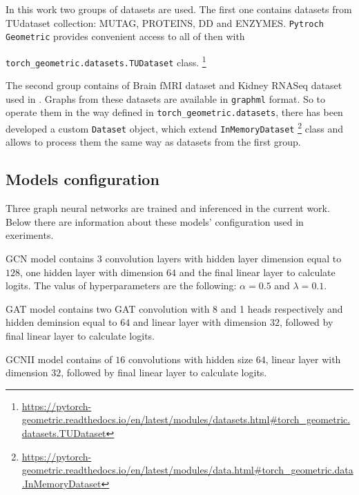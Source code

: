 


In this work two groups of datasets are used. The first one contains datasets from TUdataset\cite{TUDataset}
collection: MUTAG, PROTEINS, DD and ENZYMES. \texttt{Pytroch Geometric} provides convenient access to all of then with

\texttt{torch\_geometric.datasets.TUDataset} class.
\footnote{\url{https://pytorch-geometric.readthedocs.io/en/latest/modules/datasets.html\#torch_geometric.datasets.TUDataset}}


The second group contains of Brain fMRI dataset and Kidney RNASeq dataset used in \cite{Netpro2vec}. Graphs from
these datasets are available in \texttt{graphml} format. So to operate them in the way
defined in \texttt{torch\_geometric.datasets}, there has been developed a custom \texttt{Dataset} object, which
extend \texttt{InMemoryDataset} \footnote{\url{https://pytorch-geometric.readthedocs.io/en/latest/modules/data.html\#torch_geometric.data.InMemoryDataset}}
class and allows to process them the same way as datasets from the first group.

\subsection{Models configuration}

Three graph neural networks are trained and inferenced in the current work. Below there are information
about these models' configuration used in exeriments.

GCN model contains 3 convolution layers with hidden layer dimension equal to $128$,
one hidden layer with dimension $64$ and the final linear layer to calculate logits.
The valus of hyperparameters are the following: $\alpha=0.5$ and $\lambda=0.1$.

GAT model contains two GAT convolution with 8 and 1 heads respectively and hidden deminsion equal to $64$
and linear layer with dimension $32$, followed by  final linear layer to calculate logits.

GCNII model contains of $16$ convolutions with hidden size $64$,  linear layer with dimension $32$,
followed by  final linear layer to calculate logits.


